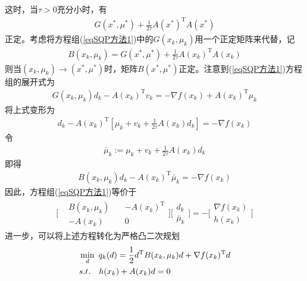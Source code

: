             这时，当$\tau >0$充分小时，有
            \begin{align*}
            G(x^*,{\mu}^*)+\frac{1}{2\tau}A(x^*)^\mathrm{T} A(x^*)
            \end{align*}
            正定。考虑将方程组(\ref{eqSQP方法1})中的$G(x_k,{\mu}_k)$用一个正定矩阵来代替，记
            \begin{align*}
            B(x_k,{\mu}_k)=G(x^*,{\mu}^*)+\frac{1}{2\tau}A(x_k)^\mathrm{T} A(x_k)
            \end{align*}
            则当$(x_k,{\mu}_k) \to (x^*,{\mu}^*)$时，矩阵$B(x^*,{\mu}^*)$正定。注意到(\ref{eqSQP方法1})方程组的展开式为
            \begin{align*}
            G(x_k,{\mu}_k)d_k-A(x_k)^\mathrm{T} v_k=-\nabla f(x_k)+A(x_k)^\mathrm{T} {\mu}_k
            \end{align*}
            将上式变形为
            \begin{align*}
            [G(x_k,{\mu}_k)+\frac{1}{2\tau}A(x_k)^\mathrm{T} A(x_k)]d_k-A(x_k)^\mathrm{T} \left[ {\mu}_k+v_k+\frac{1}{2\tau}A(x_k)d_k \right]=-\nabla f(x_k)
            \end{align*}
            令
            \begin{align*}
            {\bar{\mu}}_k:={\mu}_k+v_k+\frac{1}{2\tau}A(x_k)d_k
            \end{align*}
            即得
            \begin{align*}
            B(x_k,{\mu}_k)d_k-A(x_k)^\mathrm{T} {\bar{\mu}}_k=-\nabla f(x_k)
            \end{align*}
            因此，方程组(\ref{eqSQP方法1})等价于
            \begin{align*}
            \bigg[\begin{matrix}& B(x_k,{\mu}_k)\quad & -A(x_k)^\mathrm{T} \\
            & -A(x_k)\quad & 0\end{matrix}\bigg]\bigg[\begin{matrix}d_k\\{\bar{\mu}}_k\end{matrix}\bigg]=-\bigg[\begin{matrix}\nabla f(x_k)\\h(x_k)\end{matrix}\bigg]
            \end{align*}
            进一步，可以将上述方程转化为严格凸二次规划
            \begin{align}
            \label{eqSQP方法2}
            & \mathop {\min}\limits_d \ q_k(d)=\frac{1}{2}d^\mathrm{T} B(x_k,{\mu}_k)d+\nabla f(x_k)^\mathrm{T} d\\
            & s.t.\quad h(x_k)+A(x_k)d=0 \notag
            \end{align}
